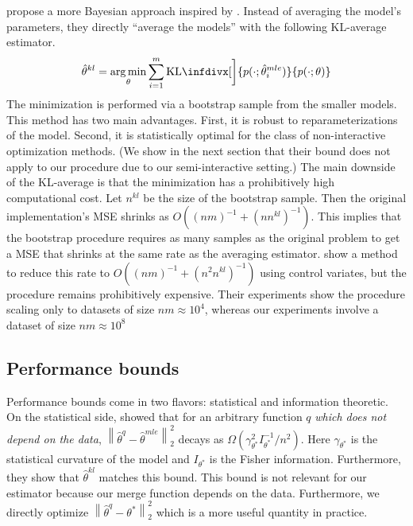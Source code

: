 \documentclass[twoside]{article}
\DeclareMathOperator*{\argmin}{arg\,min}
\newcommand{\w}{\theta}
\newcommand{\wkl}{\hat\w^{kl}}
\newcommand{\wave}{\hat\w^{ave}}
\newcommand{\wmle}{\hat\w^{mle}}
\newcommand{\wstar}{{\w^{*}}}
\newcommand{\wq}{\hat\w^{q}}
\newcommand{\ltwo}[1]{{\left\lVert {#1} \right\rVert}_2}
\newcommand{\kl}{\text{KL}\infdivx}
\begin{document}

\cite{liu2014distributed} propose a more Bayesian approach inspired by \cite{merugu2003privacy}.
Instead of averaging the model's parameters,
they directly ``average the models'' with the following KL-average estimator.
\begin{equation}
\wkl = \argmin_\w \sum_{i=1}^m \kl[\bigg]{p(\cdot;\wmle_i)}{p(\cdot;\w)}
\end{equation}
The minimization is performed via a bootstrap sample from the smaller models.
This method has two main advantages.
First, it is robust to reparameterizations of the model.
Second, it is statistically optimal for the class of non-interactive optimization methods.
(We show in the next section that their bound does not apply to our procedure due to our semi-interactive setting.)
The main downside of the KL-average is that the minimization has a prohibitively high computational cost.
Let $n^{kl}$ be the size of the bootstrap sample.
Then the original implementation's MSE shrinks as $O((nm)^{-1}+(nn^{kl})^{-1})$.
This implies that the bootstrap procedure requires as many samples as the original problem to get a MSE that shrinks at the same rate as the averaging estimator.
\cite{han2016bootstrap} show a method to reduce this rate to $O((nm)^{-1}+(n^2n^{kl})^{-1})$ using control variates, but the procedure remains prohibitively expensive.
Their experiments show the procedure scaling only to datasets of size $nm\approx10^4$,
whereas our experiments involve a dataset of size $nm\approx10^8$

\subsection{Performance bounds}

Performance bounds come in two flavors: statistical and information theoretic.
On the statistical side, \cite{liu2014distributed} showed that for an arbitrary function $q$ \emph{which does not depend on the data},
$\ltwo{\wq-\wmle}^2$ decays as $\Omega(\gamma^2_\wstar I^{-1}_\wstar/n^2)$.
Here $\gamma_\wstar$ is the statistical curvature of the model and $I_\wstar$ is the Fisher information.
Furthermore, they show that $\wkl$ matches this bound.
This bound is not relevant for our estimator because our merge function depends on the data.
Furthermore, we directly optimize $\ltwo{\wq-\wstar}^2$ which is a more useful quantity in practice.
\end{document}
